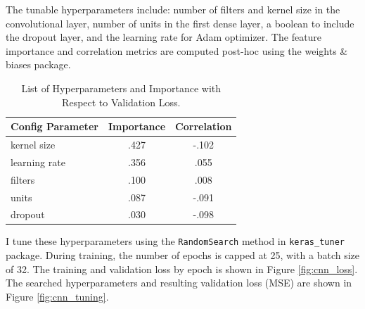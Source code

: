 \documentclass[12pt]{article}
\begin{document}
The tunable hyperparameters include: number of filters and kernel size in the convolutional layer, number of units in the first dense layer, a boolean to include the dropout layer, and the learning rate for Adam optimizer. The feature importance and correlation metrics are computed post-hoc using the weights \& biases package. 

\begin{table}[H]
    \centering
    \caption{List of Hyperparameters and Importance with Respect to Validation Loss.}
    \begin{tabular}{l|c|c}
    \hline
    \textbf{Config Parameter} & \textbf{Importance} & \textbf{Correlation} \\ \hline
    kernel size             & .427            & -.102  \\ 
    learning rate           & .356            & .055  \\ 
    filters                  & .100            & .008  \\ 
    units                    & .087            & -.091  \\ 
    dropout                  & .030            & -.098  \\ \hline
    \end{tabular}
    \label{tab:cnn_hyperparam}
\end{table}

I tune these hyperparameters using the \texttt{RandomSearch} method in \texttt{keras\_tuner} package.  During training, the number of epochs is capped at 25, with a batch size of 32. The training and validation loss by epoch is shown in Figure \ref{fig:cnn_loss}. The searched hyperparameters and resulting validation loss (MSE) are shown in Figure \ref{fig:cnn_tuning}.
\end{document}
